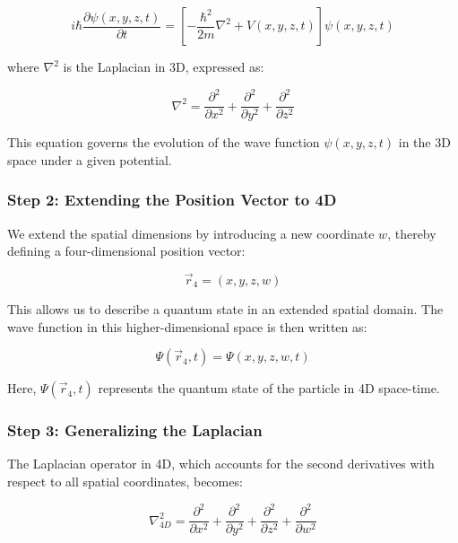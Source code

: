 \documentclass[12pt]{article}
\begin{document}
\begin{equation}
i \hbar \frac{\partial \psi(x, y, z, t)}{\partial t} = \left[ -\frac{\hbar^2}{2m} \nabla^2 + V(x, y, z, t) \right] \psi(x, y, z, t)
\end{equation}

where \( \nabla^2 \) is the Laplacian in 3D, expressed as:

\begin{equation}
\nabla^2 = \frac{\partial^2}{\partial x^2} + \frac{\partial^2}{\partial y^2} + \frac{\partial^2}{\partial z^2}
\end{equation}

This equation governs the evolution of the wave function \( \psi(x, y, z, t) \) in the 3D space under a given potential.

\subsubsection*{Step 2: Extending the Position Vector to 4D}

We extend the spatial dimensions by introducing a new coordinate \( w \), thereby defining a four-dimensional position vector:

\begin{equation}
\vec{r}_4 = (x, y, z, w)
\end{equation}

This allows us to describe a quantum state in an extended spatial domain. The wave function in this higher-dimensional space is then written as:

\begin{equation}
\Psi(\vec{r}_4, t) = \Psi(x, y, z, w, t)
\end{equation}

Here, \( \Psi(\vec{r}_4, t) \) represents the quantum state of the particle in 4D space-time.

\subsubsection*{Step 3: Generalizing the Laplacian}

The Laplacian operator in 4D, which accounts for the second derivatives with respect to all spatial coordinates, becomes:

\begin{equation}
\nabla^2_{4D} = \frac{\partial^2}{\partial x^2} + \frac{\partial^2}{\partial y^2} + \frac{\partial^2}{\partial z^2} + \frac{\partial^2}{\partial w^2}
\end{equation}
\end{document}
